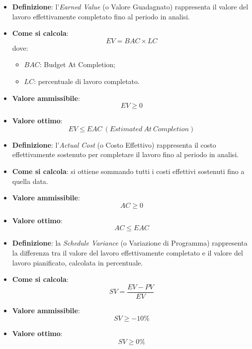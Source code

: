 \hypertarget{2M}{}
\begin{itemize}
	\item \textbf{Definizione}: l'\textit{Earned Value} (o Valore Guadagnato) rappresenta il valore del lavoro effettivamente completato fino al periodo in analisi.
	\item \textbf{Come si calcola}: \begin{equation*}EV = BAC \times LC\end{equation*} dove:
		\begin{itemize}
			\item $BAC$: Budget At Completion;
			\item $LC$: percentuale di lavoro completato.
		\end{itemize}
	\item \textbf{Valore ammissibile}: \begin{equation*}EV \geq 0\end{equation*}
	\item \textbf{Valore ottimo}: \begin{equation*}EV \leq EAC\ (Estimated\ At\ Completion)\end{equation*}
\end{itemize}

\hypertarget{3M}{}
\begin{itemize}
	\item \textbf{Definizione}: l'\textit{Actual Cost} (o Costo Effettivo) rappresenta il costo effettivamente sostenuto per completare il lavoro fino al periodo in analisi.
	\item \textbf{Come si calcola}: si ottiene sommando tutti i costi effettivi sostenuti fino a quella data.
	\item \textbf{Valore ammissibile}: \begin{equation*}AC \geq 0\end{equation*}
	\item \textbf{Valore ottimo}: \begin{equation*}AC \leq EAC\end{equation*}
\end{itemize}

\hypertarget{4M}{}
\begin{itemize}
	\item \textbf{Definizione}: la \textit{Schedule Variance} (o Variazione di Programma) rappresenta la differenza tra il valore del lavoro effettivamente completato e il valore del lavoro pianificato, calcolata in percentuale.
	\item \textbf{Come si calcola}: \begin{equation*}SV = \frac{EV - PV}{EV}\end{equation*}
	\item \textbf{Valore ammissibile}: \begin{equation*}SV \geq -10\%\end{equation*}
	\item \textbf{Valore ottimo}: \begin{equation*}SV \geq 0\%\end{equation*}
\end{itemize}

